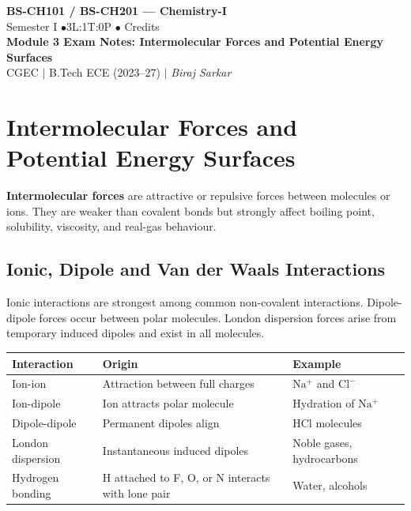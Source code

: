 \documentclass[12pt,a4paper]{article}
\begin{document}
\begin{center}
  {\LARGE\bfseries\color{myred} BS-CH101 / BS-CH201 --- Chemistry-I}\\[5pt]
  {\normalsize\color{mydark} Semester I \quad$\bullet$\quad 3L:1T:0P \quad$\bullet$ Credits}\\[3pt]
  {\normalsize\color{myteal}\textbf{Module 3 Exam Notes: Intermolecular Forces and Potential Energy Surfaces}}\\[3pt]
  {\small\color{mydark} CGEC \;$|$\; B.Tech ECE (2023--27) \;$|$\; \textit{Biraj Sarkar}}
\end{center}
\vspace{2pt}
\noindent{\color{myred}\rule{\linewidth}{1.5pt}}
\vspace{2pt}

\hypersetup{linkcolor=mydark}
\tableofcontents
\hypersetup{linkcolor=myteal}
\newpage
\section{Intermolecular Forces and Potential Energy Surfaces}

\begin{tcolorbox}[defbox]
\textbf{Intermolecular forces} are attractive or repulsive forces between molecules or ions. They are weaker than covalent bonds but strongly affect boiling point, solubility, viscosity, and real-gas behaviour.
\end{tcolorbox}

\subsection{Ionic, Dipole and Van der Waals Interactions}
Ionic interactions are strongest among common non-covalent interactions. Dipole-dipole forces occur between polar molecules. London dispersion forces arise from temporary induced dipoles and exist in all molecules.

\begin{tabularx}{\linewidth}{|B{3.2cm}|Y|Y|}
\hline
\textbf{Interaction} & \textbf{Origin} & \textbf{Example} \\
\hline
Ion-ion & Attraction between full charges & $\mathrm{Na^+}$ and $\mathrm{Cl^-}$ \\
\hline
Ion-dipole & Ion attracts polar molecule & Hydration of $\mathrm{Na^+}$ \\
\hline
Dipole-dipole & Permanent dipoles align & $\mathrm{HCl}$ molecules \\
\hline
London dispersion & Instantaneous induced dipoles & Noble gases, hydrocarbons \\
\hline
Hydrogen bonding & H attached to F, O, or N interacts with lone pair & Water, alcohols \\
\hline
\end{tabularx}
\end{document}
